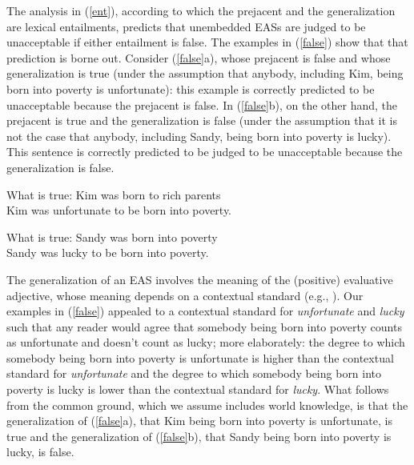 \documentclass[11pt,fleqn]{article}
\def\infelic{{\leavevmode\llap{\#}}}
\newcommand{\6}{\mbox{$[\hspace*{-.6mm}[$}}
\newcommand{\9}{\mbox{$]\hspace*{-.6mm}]$}}
\begin{document}
The analysis in (\ref{ent}), according to which the prejacent and the generalization are lexical entailments, predicts that unembedded EASs are judged to be unacceptable if either entailment is false. The examples in (\ref{false}) show that that prediction is borne out. Consider (\ref{false}a), whose prejacent is false and whose generalization is true (under the assumption that anybody, including Kim, being born into poverty is unfortunate): this example is correctly predicted to be unacceptable because the prejacent is false. In (\ref{false}b), on the other hand, the prejacent is true and the generalization is false (under the assumption that it is not the case that anybody, including Sandy, being born into poverty is lucky). This sentence is correctly predicted to be judged to be unacceptable because the generalization is false. 

\begin{exe}
\ex\label{false}
\begin{xlist}
\ex What is true: Kim was born to rich parents
\\ \infelic Kim was unfortunate to be born into poverty.

\ex What is true: Sandy was born into poverty
\\ \infelic Sandy was lucky to be born into poverty.

\end{xlist}
\end{exe}

The generalization of an EAS involves the meaning of the (positive) evaluative adjective, whose meaning depends on a contextual standard (e.g., \citealt{kennedy2001}). Our examples in (\ref{false}) appealed to a contextual standard for {\em unfortunate} and {\em lucky} such that any reader would agree that somebody being born into poverty counts as unfortunate and doesn't count as lucky; more elaborately: the degree to which somebody being born into poverty is unfortunate is higher than the contextual standard for {\em unfortunate} and the degree to which somebody being born into poverty is lucky is lower than the contextual standard for {\em lucky}. What follows from the common ground, which we assume includes world knowledge, is that the generalization of (\ref{false}a), that Kim being born into poverty is unfortunate, is true and the generalization of (\ref{false}b), that Sandy being born into poverty is lucky, is false. 
\end{document}

